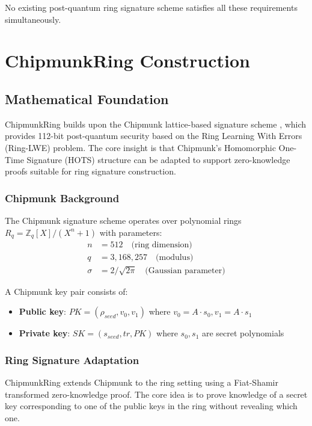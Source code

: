 \documentclass[11pt,a4paper]{article}
\begin{document}
No existing post-quantum ring signature scheme satisfies all these requirements simultaneously.

\section{ChipmunkRing Construction}

\subsection{Mathematical Foundation}

ChipmunkRing builds upon the Chipmunk lattice-based signature scheme \cite{chipmunk}, which provides 112-bit post-quantum security based on the Ring Learning With Errors (Ring-LWE) problem. The core insight is that Chipmunk's Homomorphic One-Time Signature (HOTS) structure can be adapted to support zero-knowledge proofs suitable for ring signature construction.

\subsubsection{Chipmunk Background}

The Chipmunk signature scheme operates over polynomial rings $R_q = \mathbb{Z}_q[X]/(X^n + 1)$ with parameters:
\begin{align}
n &= 512 \quad \text{(ring dimension)} \\
q &= 3,168,257 \quad \text{(modulus)} \\
\sigma &= 2/\sqrt{2\pi} \quad \text{(Gaussian parameter)}
\end{align}

A Chipmunk key pair consists of:
\begin{itemize}
\item \textbf{Public key}: $PK = (\rho_{seed}, v_0, v_1)$ where $v_0 = A \cdot s_0, v_1 = A \cdot s_1$
\item \textbf{Private key}: $SK = (s_{seed}, tr, PK)$ where $s_0, s_1$ are secret polynomials
\end{itemize}

\subsubsection{Ring Signature Adaptation}

ChipmunkRing extends Chipmunk to the ring setting using a Fiat-Shamir transformed zero-knowledge proof. The core idea is to prove knowledge of a secret key corresponding to one of the public keys in the ring without revealing which one.
\end{document}

